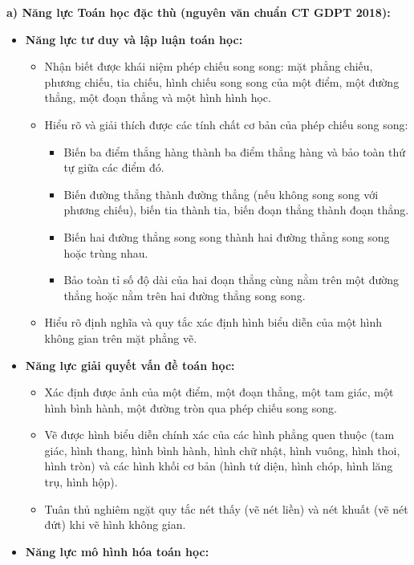 \documentclass[12pt, a4paper]{article}
\begin{document}
\textbf{a) Năng lực Toán học đặc thù (nguyên văn chuẩn CT GDPT 2018):}
\begin{itemize}[leftmargin=1.5em]
    \item \textbf{Năng lực tư duy và lập luận toán học:}
    \begin{itemize}
        \item Nhận biết được khái niệm phép chiếu song song: mặt phẳng chiếu, phương chiếu, tia chiếu, hình chiếu song song của một điểm, một đường thẳng, một đoạn thẳng và một hình hình học.
        \item Hiểu rõ và giải thích được các tính chất cơ bản của phép chiếu song song:
        \begin{itemize}
            \item Biến ba điểm thẳng hàng thành ba điểm thẳng hàng và bảo toàn thứ tự giữa các điểm đó.
            \item Biến đường thẳng thành đường thẳng (nếu không song song với phương chiếu), biến tia thành tia, biến đoạn thẳng thành đoạn thẳng.
            \item Biến hai đường thẳng song song thành hai đường thẳng song song hoặc trùng nhau.
            \item Bảo toàn tỉ số độ dài của hai đoạn thẳng cùng nằm trên một đường thẳng hoặc nằm trên hai đường thẳng song song.
        \end{itemize}
        \item Hiểu rõ định nghĩa và quy tắc xác định hình biểu diễn của một hình không gian trên mặt phẳng vẽ.
    \end{itemize}
    \item \textbf{Năng lực giải quyết vấn đề toán học:}
    \begin{itemize}
        \item Xác định được ảnh của một điểm, một đoạn thẳng, một tam giác, một hình bình hành, một đường tròn qua phép chiếu song song.
        \item Vẽ được hình biểu diễn chính xác của các hình phẳng quen thuộc (tam giác, hình thang, hình bình hành, hình chữ nhật, hình vuông, hình thoi, hình tròn) và các hình khối cơ bản (hình tứ diện, hình chóp, hình lăng trụ, hình hộp).
        \item Tuân thủ nghiêm ngặt quy tắc nét thấy (vẽ nét liền) và nét khuất (vẽ nét đứt) khi vẽ hình không gian.
    \end{itemize}
    \item \textbf{Năng lực mô hình hóa toán học:}
    \begin{itemize}

\end{itemize}
\end{itemize}
\end{document}
